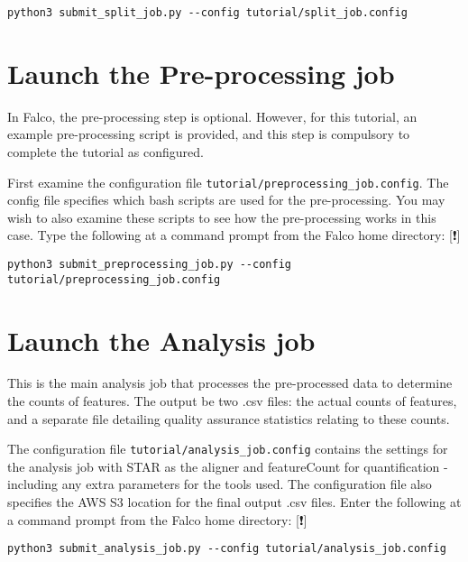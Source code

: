 \documentclass[]{book}
\begin{document}
\begin{verbatim}
python3 submit_split_job.py --config tutorial/split_job.config
\end{verbatim}

\hypertarget{launch-the-pre-processing-job}{%
\section{Launch the Pre-processing job}\label{launch-the-pre-processing-job}}

In Falco, the pre-processing step is optional. However, for this tutorial, an example pre-processing script is provided, and this step is compulsory to complete the tutorial as configured.

First examine the configuration file \texttt{tutorial/preprocessing\_job.config}. The config file specifies which bash scripts are used for the pre-processing. You may wish to also examine these scripts to see how the pre-processing works in this case. Type the following at a command prompt from the Falco home directory: {[}❗️{]}

\begin{verbatim}
python3 submit_preprocessing_job.py --config tutorial/preprocessing_job.config
\end{verbatim}

\hypertarget{launch-the-analysis-job}{%
\section{Launch the Analysis job}\label{launch-the-analysis-job}}

This is the main analysis job that processes the pre-processed data to determine the counts of features. The output be two .csv files: the actual counts of features, and a separate file detailing quality assurance statistics relating to these counts.

The configuration file \texttt{tutorial/analysis\_job.config} contains the settings for the analysis job with STAR as the aligner and featureCount for quantification - including any extra parameters for the tools used. The configuration file also specifies the AWS S3 location for the final output .csv files. Enter the following at a command prompt from the Falco home directory: {[}❗️{]}

\begin{verbatim}
python3 submit_analysis_job.py --config tutorial/analysis_job.config
\end{verbatim}
\end{document}
